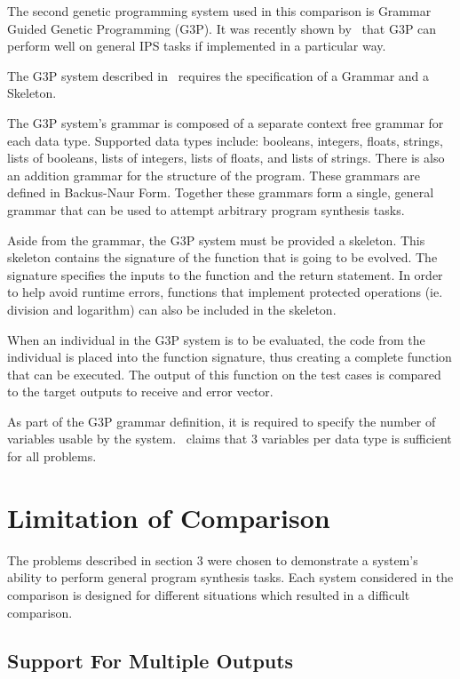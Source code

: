 The second genetic programming system used in this comparison is Grammar Guided Genetic Programming (G3P). It was recently shown by~\cite{Forstenlechner:2017:eurogp} that G3P can perform well on general IPS tasks if implemented in a particular way.

The G3P system described in~\cite{Forstenlechner:2017:eurogp} requires the specification of a Grammar and a Skeleton. 

The G3P system's grammar is composed of a separate context free grammar for each data type. Supported data types include: booleans, integers, floats, strings, lists of booleans, lists of integers, lists of floats, and lists of strings. There is also an addition grammar for the structure of the program.  These grammars are defined in Backus-Naur Form. Together these grammars form a single, general grammar that can be used to attempt arbitrary program synthesis tasks.

Aside from the grammar, the G3P system must be provided a skeleton. This skeleton contains the signature of the function that is going to be evolved. The signature specifies the inputs to the function and the return statement. In order to help avoid runtime errors, functions that implement protected operations (ie. division and logarithm) can also be included in the skeleton.

When an individual in the G3P system is to be evaluated, the code from the individual is placed into the function signature, thus creating a complete function that can be executed. The output of this function on the test cases is compared to the target outputs to receive and error vector.

As part of the G3P grammar definition, it is required to specify the number of variables usable by the system.~\cite{Forstenlechner:2017:eurogp} claims that 3 variables per data type is sufficient for all problems.

\section{Limitation of Comparison}

The problems described in section 3 were chosen to demonstrate a system's ability to perform general program synthesis tasks. Each system considered in the comparison is designed for different situations which resulted in a difficult comparison.

\subsection{Support For Multiple Outputs}

